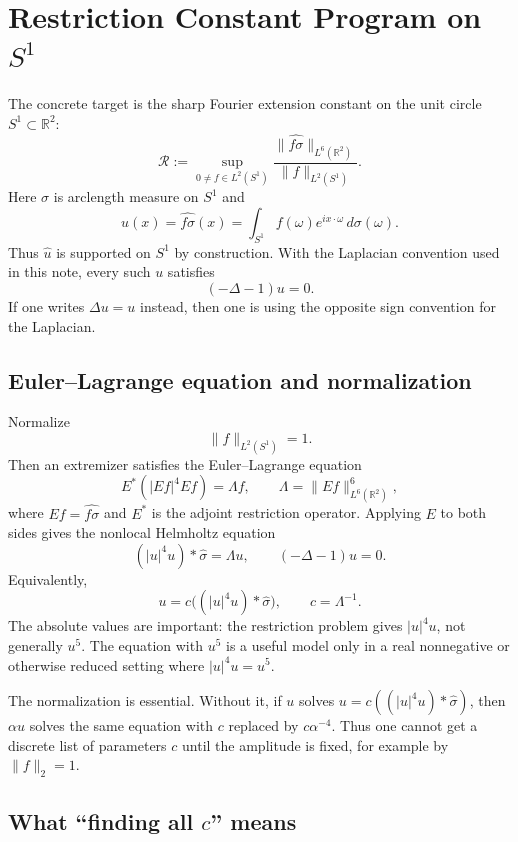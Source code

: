 \documentclass[12pt]{article}
\begin{document}
\section{\texorpdfstring{Restriction Constant Program on $S^1$}{Restriction Constant Program on S1}}

The concrete target is the sharp Fourier extension constant on the unit circle
$S^1\subset\mathbb R^2$:
\[
  \mathcal R
  :=
  \sup_{0\neq f\in L^2(S^1)}
  \frac{\|\widehat{f\sigma}\|_{L^6(\mathbb R^2)}}{\|f\|_{L^2(S^1)}}.
\]
Here $\sigma$ is arclength measure on $S^1$ and
\[
  u(x)=\widehat{f\sigma}(x)
     =\int_{S^1} f(\omega)e^{ix\cdot\omega}\,d\sigma(\omega).
\]
Thus $\widehat u$ is supported on $S^1$ by construction. With the Laplacian
convention used in this note, every such $u$ satisfies
\[
  (-\Delta-1)u=0.
\]
If one writes $\Delta u=u$ instead, then one is using the opposite sign
convention for the Laplacian.

\subsection{Euler--Lagrange equation and normalization}

Normalize
\[
  \|f\|_{L^2(S^1)}=1.
\]
Then an extremizer satisfies the Euler--Lagrange equation
\[
  E^*(|Ef|^4Ef)=\Lambda f,
  \qquad
  \Lambda=\|Ef\|_{L^6(\mathbb R^2)}^6,
\]
where $E f=\widehat{f\sigma}$ and $E^*$ is the adjoint restriction operator.
Applying $E$ to both sides gives the nonlocal Helmholtz equation
\[
  (|u|^4u)*\widehat{\sigma}=\Lambda u,
  \qquad
  (-\Delta-1)u=0.
\]
Equivalently,
\[
  u=c\bigl((|u|^4u)*\widehat{\sigma}\bigr),
  \qquad c=\Lambda^{-1}.
\]
The absolute values are important: the restriction problem gives
$|u|^4u$, not generally $u^5$. The equation with $u^5$ is a useful model only
in a real nonnegative or otherwise reduced setting where $|u|^4u=u^5$.

The normalization is essential. Without it, if $u$ solves
$u=c((|u|^4u)*\widehat\sigma)$, then $\alpha u$ solves the same equation with
$c$ replaced by $c\alpha^{-4}$. Thus one cannot get a discrete list of
parameters $c$ until the amplitude is fixed, for example by
$\|f\|_2=1$.

\subsection{What ``finding all \texorpdfstring{$c$}{c}'' means}
\end{document}

